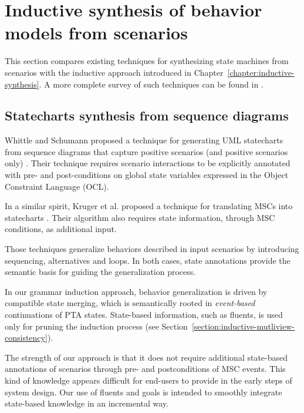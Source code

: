 \section{Inductive synthesis of behavior models from scenarios\label{section:related-from-scenarios}}

This section compares existing techniques for synthesizing state machines from scenarios with the inductive approach introduced in Chapter~\ref{chapter:inductive-synthesis}. A more complete survey of such techniques can be found in \cite{Liang:2006}.


\subsection{Statecharts synthesis from sequence diagrams}

Whittle and Schumann proposed a technique for generating UML statecharts from sequence diagrams that capture positive scenarios (and positive scenarios only) \cite{Whittle:2000}. Their technique requires scenario interactions to be explicitly annotated with pre- and post-conditions on global state variables expressed in the Object Constraint Language (OCL). 

In a similar spirit, Kruger et al. proposed a technique for translating MSCs into statecharts \cite{Kruger:2000}. Their algorithm also requires state information, through MSC conditions, as additional input.

Those techniques generalize behaviors described in input scenarios by introducing sequencing, alternatives and loops. In both cases, state annotations provide the semantic basis for guiding the generalization process. 

In our grammar induction approach, behavior generalization is driven by compatible state merging, which is semantically rooted in \emph{event-based} continuations of PTA states. State-based information, such as fluents, is used only for pruning the induction process (see Section~\ref{section:inductive-mutliview-consistency}). 

The strength of our approach is that it does not require additional state-based annotations of scenarios through pre- and postconditions of MSC events. This kind of knowledge appears difficult for end-users to provide in the early steps of system design. Our use of fluents and goals is intended to smoothly integrate state-based knowledge in an incremental way.


